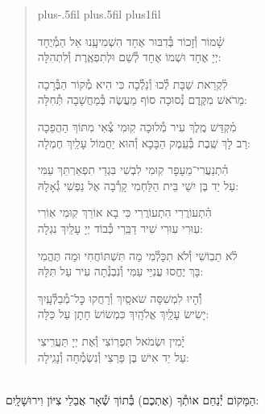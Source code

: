 \documentclass[twoside, openany, parskip=half, 11pt]{book}
\begin{document}
\begin{quote}
\leftskip=0pt plus-.5fil
\rightskip=0pt plus.5fil
\parfillskip=0pt plus1fil


\lechadodi

שָׁ֗מוֹר וְ֯זָכוֹר בְּ֯דִבּוּר אֶחָד \hfill
הִשְׁמִיעָֽנוּ אֵל הַמְ֯יֻחָד \\
יְיָ אֶחָד וּשְׁמוֹ אֶחָד \hfill
לְ֯שֵׁם וּלְתִפְאֶֽרֶת וְ֯לִתְהִלָּה:

\lechadodi

לִ֗קְרַאת שַׁבָּת לְ֯כוּ וְ֯נֵלְ֯כָה \hfill
כִּי הִיא מְ֯קוֹר הַבְּ֯רָכָה \\
מֵרֹאשׁ מִקֶּֽדֶם נְ֯סוּכָה \hfill
סוֹף מַעֲשֶׂה בְּ֯מַחֲשָׁבָה תְּ֯חִלָּה:

\lechadodi

מִ֗קְדַּשׁ מֶֽלֶךְ עִיר מְ֯לוּכָה \hfill
קֽוּמִי צְ֯אִי מִתּוֹךְ הַהֲפֵכָה \\
רַב לָךְ שֶֽׁבֶת בְּ֯עֵֽמֶק הַבָּכָא \hfill
וְ֯הוּא יַחֲמוֹל עָלַֽיִךְ חֶמְלָה:

\lechadodi

הִ֗תְנַעֲרִי־מֵעָפָר קֽוּמִי \hfill
לִבְשִׁי בִּגְדֵי תִפְאַרְתֵּךְ עַמִּי \\
עַל יַד בֶּן יִשַׁי בֵּית הַלַּחְמִי \hfill
קָרְ֯בָה אֶל נַפְשִׁי גְ֯אָלָהּ:

\lechadodi

הִ֗תְעוֹרֲרִי הִתְעוֹרֲרִי \hfill
כִּי בָא אוֹרֵךְ קֽוּמִי אֽוֹרִי \\
עֽוּרִי עֽוּרִי שִׁיר דַבֵּֽרִי \hfill
כְּ֯בוֹד יְיָ עָלַֽיִךְ נִגְלָה:

\lechadodi

לֹ֗א תֵבֽוֹשִׁי וְ֯לֹא תִכָּלְ֯מִי \hfill
מַה תִּשְׁתּוֹחֲחִי וּמַה תֶּהֱמִי \\
בָּךְ יֶחֱסוּ עֲנִיֵּי עַמִּי \hfill
וְ֯נִבְנְ֯תָה עִיר עַל תִּלָּהּ:

\lechadodi

וְ֯֗הָיוּ לִמְשִׁסָּה שֹׁאסָֽיִךְ \hfill
וְ֯רָחֲקוּ כׇּל־מְ֯בַלְּ֯עָֽיִךְ \\
יָשִׂישׂ עָלַֽיִךְ אֱלֹהָֽיִךְ \hfill
כִּמְשׂוֹשׂ חָתָן עַל כַּלָּה:

\lechadodi

יָ֗מִין וּשְׂמֹאל תִּפְרֽוֹצִי \hfill
וְ֯אֶת יְיָ תַּעֲרִֽיצִי \\
עַל יַד אִישׁ בֶּן פַּרְצִי \hfill
וְ֯נִשְׂמְ֯חָה וְ֯נָגִֽילָה:

\lechadodi

\end{quote}

\begin{sometimes}

\\
הַמָּקוֹם יְ֯נַחֵם אוֹתְ֯ךָ (אֶתְכֶם) בְּ֯תוֹךְ שְׁ֯אָר אֲבֵלֵי צִיּוֹן וִירוּשָׁלָֽיִם:

\end{sometimes}
\end{document}

